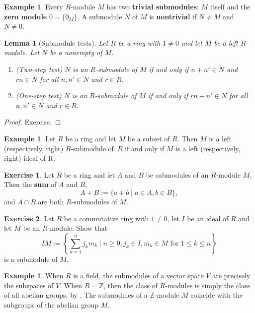 \documentclass[12pt]{report}
\newtheorem{lemma}[theorem]{Lemma}
\numberwithin{equation}{section}
\numberwithin{theorem}{chapter}
\theoremstyle{definition}
\newtheorem{example}[theorem]{Example}
\newtheorem{exercise}{Exercise}
\newtheorem*{basic properties}{Basic Properties}
\newtheorem*{Important Remark}{Important Remark}
\newcommand{\df}[1]{{\bf #1}\index{#1}}
\begin{document}
\begin{example}
	Every $R$-module $M$ has two \df{trivial submodules}: $M$ itself and the \df{zero module} $0 = \{ 0_M \}$. A submodule $N$ of $M$ is {\bf nontrivial} if $N \neq M$ and $N \neq 0$.
\end{example}


\begin{lemma}[Submodule tests] 
Let $R$ be a ring with $1 \neq  0$ and let $M$ be a left $R$-module. 
Let $N$ be a nonempty of $M$.
\begin{enumerate}
\item (Two-step test) $N$ is an $R$-submodule of $M$ if and only if $n+n' \in N$ and $rn \in N$ for all $n,n'\in N$ and $r\in R$.
\item (One-step test) $N$ is an $R$-submodule of $M$ if and only if $rn+n'\in N$ for all $n,n'\in N$ and $r\in R$.
\end{enumerate}
\end{lemma}

\begin{proof}
Exercise.
\end{proof}



\begin{example}
Let $R$ be a ring and let $M$ be a subset of $R$. Then $M$ is a left (respectively, right)  $R$-submodule of~$R$ if and only if $M$ is a left (respectively, right) ideal of R.
\end{example}

\begin{exercise}\label{sum and intersection of submods}
	Let $R$ be a ring and let $A$ and $B$ be submodules of an $R$-module $M$. Then the {\bf sum} of $A$ and $B$,
	$$A + B := \{ a + b \mid a \in A, b \in B \},$$
	and $A \cap B$ are both $R$-submodules of $M$.
\end{exercise}

\begin{exercise}
Let $R$ be a commutative ring with $1\neq 0$, let $I$ be an ideal of $R$ and let $M$ be an $R$-module. Show that
$$IM := \left\{\sum_{k=1}^n j_km_k \mid n \geqslant 0, j_k \in I, m_k \in M \text{ for } 1 \leqslant k \leqslant n \right\}$$
is a submodule of $M$.
\end{exercise}


\begin{example}
When $R$ is a field, the submodules of a vector space $V$ are precisely the subspaces of $V$.
When $R = \mathbb{Z}$, then the class of $R$-modules is simply the class of all abelian groups, by . The submodules of a $\mathbb{Z}$-module $M$ coincide with the subgroups of the abelian group $M$. 
\end{example}
\end{document}
